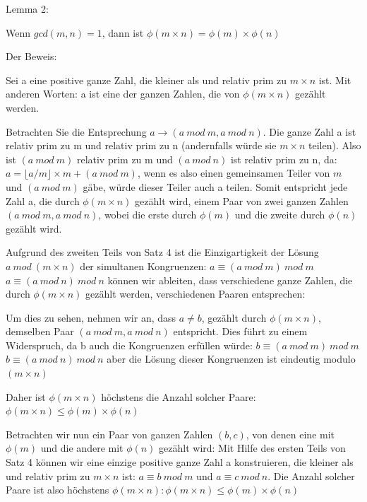 \documentclass[a4paper]{article}
\begin{document}
\begin{multicols}{3}
\begin{itemize*}
\begin{itemize*}
            \end{itemize*}
            \item Lemma 2:
            \begin{itemize*}
                  \item Wenn $gcd(m,n)=1$, dann ist $\phi(m\times n)=\phi(m)\times \phi(n)$
                  \item Der Beweis:
                  \begin{itemize*}
                        \item Sei a eine positive ganze Zahl, die kleiner als und relativ prim zu $m\times n$ ist. Mit anderen Worten: a ist eine der ganzen Zahlen, die von $\phi(m\times n)$ gezählt werden.
                        \item Betrachten Sie die Entsprechung $a\rightarrow(a\ mod\ m, a\ mod\ n)$. Die ganze Zahl a ist relativ prim zu m und relativ prim zu n (andernfalls würde sie $m \times n$ teilen). Also ist $(a\ mod\ m)$ relativ prim zu m und $(a\ mod\ n)$ ist relativ prim zu n, da: $a=\lfloor a/m\rfloor\times m + (a\ mod\ m)$, wenn es also einen gemeinsamen Teiler von $m$ und $(a\ mod\ m)$ gäbe, würde dieser Teiler auch a teilen. Somit entspricht jede Zahl a, die durch $\phi(m\times n )$ gezählt wird, einem Paar von zwei ganzen Zahlen $(a\ mod\ m,a\ mod\ n)$, wobei die erste durch $\phi(m)$ und die zweite durch $\phi(n)$ gezählt wird.
                        \item Aufgrund des zweiten Teils von Satz 4 ist die Einzigartigkeit der Lösung $a\ mod\ (m\times n)$ der simultanen Kongruenzen: $a \equiv(a\ mod\ m)\ mod\ m$ $a \equiv(a\ mod\ n)\ mod\ n$ können wir ableiten, dass verschiedene ganze Zahlen, die durch $\phi(m\times n)$ gezählt werden, verschiedenen Paaren entsprechen:
                        \begin{itemize*}
                              \item Um dies zu sehen, nehmen wir an, dass $a\not=b$, gezählt durch $\phi(m\times n)$, demselben Paar $(a\ mod\ m, a\ mod\ n)$ entspricht. Dies führt zu einem Widerspruch, da b auch die Kongruenzen erfüllen würde: $b\equiv (a\ mod\ m)\ mod\ m$ $b\equiv (a\ mod\ n)\ mod\ n$ aber die Lösung dieser Kongruenzen ist eindeutig modulo $(m \times n)$
                              \item Daher ist $\phi(m \times n)$ höchstens die Anzahl solcher Paare: $\phi(m \times n)\leq \phi(m)\times \phi(n)$
                        \end{itemize*}
                        \item Betrachten wir nun ein Paar von ganzen Zahlen $(b,c)$, von denen eine mit $\phi(m)$ und die andere mit $\phi(n)$ gezählt wird: Mit Hilfe des ersten Teils von Satz 4 können wir eine einzige positive ganze Zahl a konstruieren, die kleiner als und relativ prim zu $m\times n$ ist: $a\equiv b\ mod\ m$ und $a\equiv c\ mod\ n$. Die Anzahl solcher Paare ist also höchstens $\phi(m \times n):\phi(m \times n)\leq\phi(m)\times\phi(n)$
                  \end{itemize*}
            \end{itemize*}
      \end{itemize*}


\end{multicols}
\end{document}
